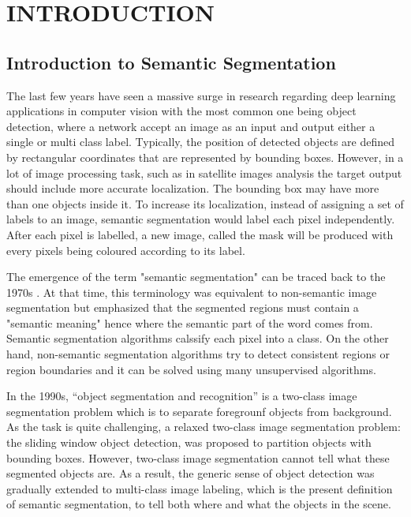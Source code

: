 \chapter{INTRODUCTION}
\section{Introduction to Semantic Segmentation}

The last few years have seen a massive surge in research regarding deep learning applications in computer vision with the most common one being object detection, where a network accept an image as an input and output either a single or multi class label. Typically, the position of detected objects are defined by rectangular coordinates that are represented by bounding boxes. However, in a lot of image processing task, such as in satellite images analysis the target output should include more accurate localization. The bounding box may have more than one objects inside it. To increase its localization, instead of assigning a set of labels to an image, semantic segmentation would label each pixel independently. After each pixel is labelled, a new image, called the mask  will be produced with every pixels being coloured according to its label.

The emergence of the term "semantic segmentation" can be traced back to the 1970s \cite{YU201882}. At that time, this terminology was equivalent to non-semantic image segmentation but emphasized that the segmented regions must contain a "semantic meaning" hence where the semantic part of the word comes from. Semantic segmentation algorithms calssify each pixel into a class. On the other hand, non-semantic segmentation algorithms try to detect consistent regions or region boundaries and it can be solved using many unsupervised algorithms. 

In the 1990s, “object segmentation and recognition” is a two-class image segmentation problem which is to separate foregrounf objects from background. As the task is quite challenging, a relaxed two-class image segmentation problem: the sliding window object detection, was proposed to partition objects with bounding boxes. However, two-class image segmentation cannot tell what these segmented objects are. As a result, the generic sense of object detection was gradually extended to multi-class image labeling, which is the present definition of semantic segmentation, to tell both where and what the objects in the scene.

